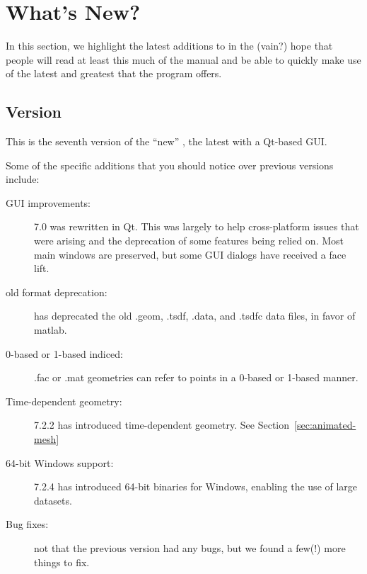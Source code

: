 \section{What's New?}
\label{sec:new-features} 

In this section, we highlight the latest additions to \map{} in the
(vain?) hope that people will read at least this much of the manual
and be able to quickly make use of the latest and greatest that the program
offers.

\subsection{Version~\version{}}

This is the seventh version of the ``new'' \map{}, the latest with a Qt-based GUI.

Some of the specific additions that you should notice over previous versions
include:
%
\begin{description}
  \item [GUI improvements: ] \map{} 7.0 was rewritten in Qt.
    This was largely to help cross-platform issues that were
    arising and the deprecation of some features being relied
    on.
    Most main windows are preserved, but some GUI dialogs have
    received a face lift.
  \item [old format deprecation: ] \map{} has deprecated the old .geom, .tsdf, .data, and .tsdfc data files, in favor of matlab.
  \item [0-based or 1-based indiced: ] .fac or .mat geometries can refer to points in a 0-based or 1-based manner.
  \item [Time-dependent geometry: ] \map{} 7.2.2 has introduced time-dependent geometry.  See Section~\ref{sec:animated-mesh}
  \item [64-bit Windows support: ] \map{} 7.2.4 has introduced 64-bit binaries for Windows, enabling the use of large datasets.
  \item [Bug fixes: ] not that the previous version had any bugs, but we
    found a few(!) more things to fix.
\end{description}

